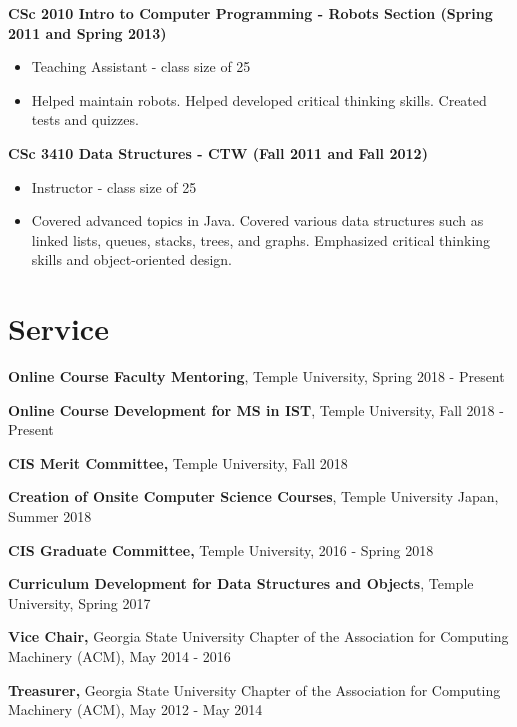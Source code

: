 \documentclass{res}
\begin{document}
\begin{resume}
{\bf CSc 2010 Intro to Computer Programming - Robots Section (Spring 2011 and Spring 2013) }
    \begin{itemize}
      \item Teaching Assistant - class size of 25
      \item Helped maintain robots.  Helped developed critical thinking skills.  Created tests and quizzes.
    \end{itemize}


{\bf CSc 3410 Data Structures  - CTW (Fall 2011 and  Fall 2012) }
    \begin{itemize}
    \item Instructor - class size of 25
      \item Covered advanced topics in Java.  Covered various data structures such as linked lists, queues, stacks, trees, and graphs.  Emphasized critical thinking skills and object-oriented design.
    \end{itemize}

\newpage
\section{Service}


\textbf{Online Course Faculty Mentoring}, Temple University, Spring 2018 - Present

\textbf{Online Course Development for MS in IST}, Temple University, Fall 2018 - Present

\textbf{CIS Merit Committee,} Temple University, Fall 2018

\textbf{Creation of Onsite Computer Science Courses}, Temple University Japan, Summer 2018

\textbf{CIS Graduate Committee,} Temple University, 2016 - Spring 2018

\textbf{Curriculum Development for Data Structures and Objects}, Temple University, Spring 2017

{\bf Vice Chair,} Georgia State University Chapter of the Association for Computing Machinery (ACM),  May 2014 - 2016

{\bf Treasurer,} Georgia State University Chapter of the Association for Computing Machinery (ACM), May 2012 - May 2014


\end{resume}
\end{document}
